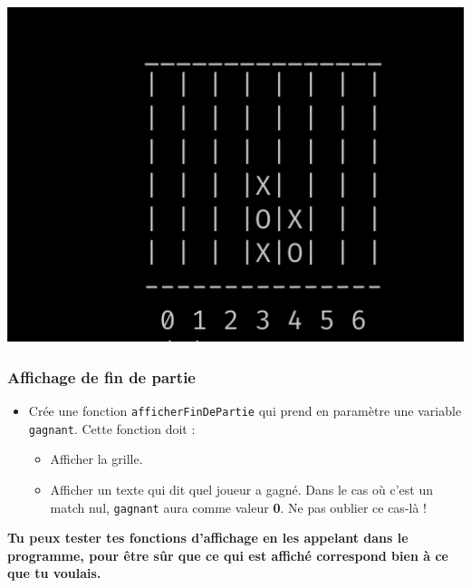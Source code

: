 \documentclass[11pt]{article}
\begin{document}
\begin{center}
\includegraphics[width=.9\linewidth]{./img/exemple_tours.png}
\end{center}

\subsubsection*{Affichage de fin de partie}
\label{sec:org8f4a80c}
\begin{itemize}
\item Crée une fonction \texttt{afficherFinDePartie} qui prend en paramètre une variable \texttt{gagnant}. Cette fonction doit :
\begin{itemize}
\item Afficher la grille.
\item Afficher un texte qui dit quel joueur a gagné. Dans le cas où c'est un match nul, \texttt{gagnant} aura comme valeur \textbf{0}. Ne pas oublier ce cas-là !
\end{itemize}
\end{itemize}

\textbf{Tu peux tester tes fonctions d'affichage en les appelant dans le programme, pour être sûr que ce qui est affiché correspond bien à ce que tu voulais.}
\end{document}
